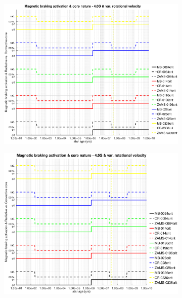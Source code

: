 \documentclass[fleqn,usenatbib]{mnras}
\begin{document}
{{\begin{figure}
    \begin{subfigure}[h]{0.47\textwidth}
    \includegraphics[trim = 30mm 15mm 20mm 15mm, clip,width=\textwidth]{figures/mb_act_var_vel_4_0g.eps}
    \label{fig:subim33}
    \end{subfigure}
    \begin{subfigure}[h]{0.47\textwidth}
    \includegraphics[trim = 30mm 15mm 20mm 15mm, clip,width=\textwidth]{figures/mb_act_var_vel_4_5g.eps}
    \label{fig:subim34}
    \end{subfigure}
    \begin{subfigure}[h]{0.47\textwidth}

\end{subfigure}
\end{figure}}}
\end{document}
